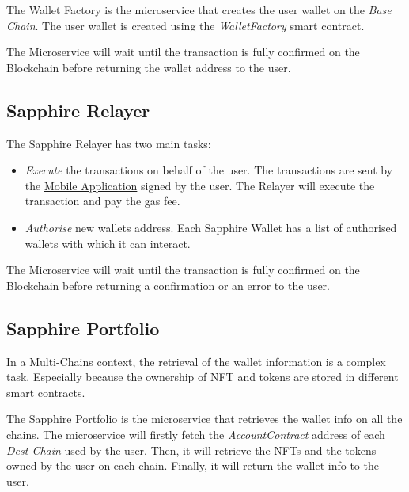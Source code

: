 The Wallet Factory is the microservice that creates the user wallet on the \textit{Base Chain}. The user wallet is created using the \textit{WalletFactory} smart contract.  

The Microservice will wait until the transaction is fully confirmed on the Blockchain before returning the wallet address to the user.

\subsection{Sapphire Relayer}
\label{subsec:sapphire_relayer}

The Sapphire Relayer has two main tasks:

\begin{itemize}
    \item \textit{Execute} the transactions on behalf of the user. The transactions are sent by the \hyperref[sec:mobile_application]{Mobile Application} signed by the user. The Relayer will execute the transaction and pay the gas fee.
    \item \textit{Authorise} new wallets address. Each Sapphire Wallet has a list of authorised wallets with which it can interact.
\end{itemize}

The Microservice will wait until the transaction is fully confirmed on the Blockchain before returning a confirmation or an error to the user.

\subsection{Sapphire Portfolio}
\label{subsec:sapphire_portfolio}

In a Multi-Chains context, the retrieval of the wallet information is a complex task. Especially because the ownership of NFT and tokens are stored in different smart contracts.

The Sapphire Portfolio is the microservice that retrieves the wallet info on all the chains. The microservice will firstly fetch the \textit{AccountContract} address of each \textit{Dest Chain} used by the user. Then, it will retrieve the NFTs and the tokens owned by the user on each chain. Finally, it will return the wallet info to the user.
